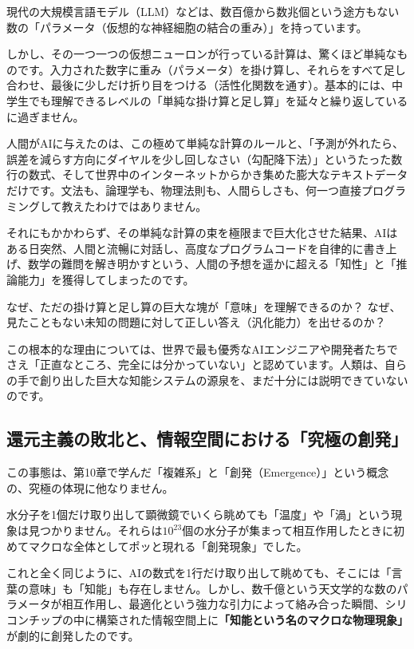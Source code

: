現代の大規模言語モデル（LLM）などは、数百億から数兆個という途方もない数の「パラメータ（仮想的な神経細胞の結合の重み）」を持っています。

しかし、その一つ一つの仮想ニューロンが行っている計算は、驚くほど単純なものです。入力された数字に重み（パラメータ）を掛け算し、それらをすべて足し合わせ、最後に少しだけ折り目をつける（活性化関数を通す）。基本的には、中学生でも理解できるレベルの「単純な掛け算と足し算」を延々と繰り返しているに過ぎません。

人間がAIに与えたのは、この極めて単純な計算のルールと、「予測が外れたら、誤差を減らす方向にダイヤルを少し回しなさい（勾配降下法）」というたった数行の数式、そして世界中のインターネットからかき集めた膨大なテキストデータだけです。文法も、論理学も、物理法則も、人間らしさも、何一つ直接プログラミングして教えたわけではありません。

それにもかかわらず、その単純な計算の束を極限まで巨大化させた結果、AIはある日突然、人間と流暢に対話し、高度なプログラムコードを自律的に書き上げ、数学の難問を解き明かすという、人間の予想を遥かに超える「知性」と「推論能力」を獲得してしまったのです。

なぜ、ただの掛け算と足し算の巨大な塊が「意味」を理解できるのか？ なぜ、見たこともない未知の問題に対して正しい答え（汎化能力）を出せるのか？

この根本的な理由については、世界で最も優秀なAIエンジニアや開発者たちでさえ「正直なところ、完全には分かっていない」と認めています。人類は、自らの手で創り出した巨大な知能システムの源泉を、まだ十分には説明できていないのです。

\subsection{還元主義の敗北と、情報空間における「究極の創発」}

この事態は、第10章で学んだ「複雑系」と「創発（Emergence）」という概念の、究極の体現に他なりません。

水分子を1個だけ取り出して顕微鏡でいくら眺めても「温度」や「渦」という現象は見つかりません。それらは\(10^{23}\)個の水分子が集まって相互作用したときに初めてマクロな全体としてポッと現れる「創発現象」でした。

これと全く同じように、AIの数式を1行だけ取り出して眺めても、そこには「言葉の意味」も「知能」も存在しません。しかし、数千億という天文学的な数のパラメータが相互作用し、最適化という強力な引力によって絡み合った瞬間、シリコンチップの中に構築された情報空間上に\textbf{「知能という名のマクロな物理現象」}が劇的に創発したのです。

